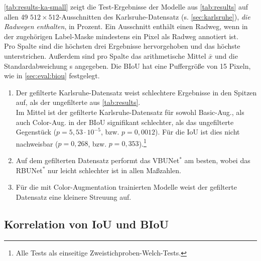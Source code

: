 \autoref{tab:results-ka-small} zeigt die Test-Ergebnisse der Modelle aus \autoref{tab:results} 
auf allen 49 $512{\times}512$-Ausschnitten des Karlsruhe-Datensatz (s. \autoref{sec:karlsruhe}), 
\textit{die Radwegen enthalten}, in Prozent. 
Ein Ausschnitt enthält einen Radweg, wenn in der zugehörigen Label-Maske mindestens ein Pixel als Radweg annotiert ist. \\
Pro Spalte sind die höchsten drei Ergebnisse hervorgehoben und das höchste unterstrichen.
Außerdem sind pro Spalte das arithmetische Mittel $\bar{x}$ und die Standardabweichung s angegeben. 
Die \ac{BIoU} hat eine Puffergröße von 15 Pixeln, wie in \autoref{sec:eval:biou} festgelegt.
\begin{enumerate}
	\item Der gefilterte Karlsruhe-Datensatz weist schlechtere Ergebnisse in den Spitzen auf, 
	als der ungefilterte aus \autoref{tab:results}. \\
	Im Mittel ist der gefilterte Karlsruhe-Datensatz für sowohl Basic-Aug., als auch Color-Aug. in der BIoU  
	signifikant schlechter, als das ungefilterte Gegenstück ($p = 5,53 \cdot 10^{-5}$, bzw. $p = 0,0012$). 
	Für die IoU ist dies nicht nachweisbar ($p = 0,268$, bzw. $p = 0,353$).\footnote{Alle Tests als einseitige Zweistichproben-Welch-Tests.}    
	\item Auf dem gefilterten Datensatz performt das VBUNet$^*$ am besten, wobei das RBUNet$^*$ nur leicht schlechter ist in allen Maßzahlen.
	\item Für die mit Color-Augmentation trainierten Modelle weist der gefilterte Datensatz eine kleinere Streuung auf. 
\end{enumerate}

\subsection{Korrelation von IoU und BIoU}

